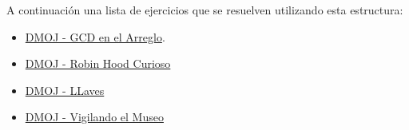 A continuación una lista de ejercicios que se resuelven utilizando esta estructura:

\begin{itemize}
	\item \href{https://dmoj.uclv.edu.cu/problem/onlinegcd} {DMOJ - GCD en el Arreglo}. 
	\item \href{https://dmoj.uclv.edu.cu/problem/curiousrobinhood} {DMOJ - Robin Hood Curioso}
	\item \href{https://dmoj.uclv.edu.cu/problem/llaves} {DMOJ - LLaves}
	\item \href{https://dmoj.uclv.edu.cu/problem/museo} {DMOJ - Vigilando el Museo}
\end{itemize}